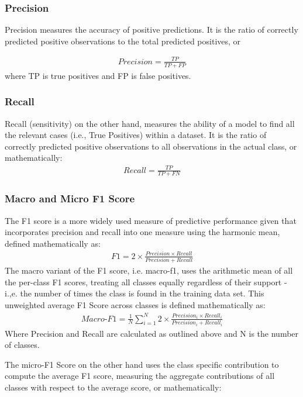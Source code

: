 \documentclass[final]{clv2025-revised}
\begin{document}
\subsubsection{Precision}
Precision measures the accuracy of positive predictions. It is the ratio of correctly predicted positive observations to the total predicted positives, or 

\begin{align*}
    Precision=\frac{TP}{TP+FP}
\end{align*}
where TP is true positives and FP is false positives. 

\subsubsection{Recall}
Recall (sensitivity) on the other hand, measures the ability of a model to find all the relevant cases (i.e., True Positives) within a dataset. It is the ratio of correctly predicted positive observations to all observations in the actual class, or mathematically:
\begin{align*}
    Recall=\frac{TP}{TP+FN}
\end{align*}

\subsubsection{Macro and Micro F1 Score}
The F1 score is a more widely used measure of predictive performance given that incorporates precision and recall into one measure using the harmonic mean, defined mathematically as: 
\begin{align*}
  F1=2\times \frac{Precision\times Recall}{Precision+Recall}  
\end{align*}
The macro variant of the F1 score, i.e. macro-f1, uses the arithmetic mean of all the per-class F1 scores, treating all classes equally regardless of their support - i.,e. the number of times the class is found in the training data set. This unweighted average F1 Score across classes is defined mathematically as:
\begin{align*}
    Macro\text{-}F1=\frac{1}{N }\sum_{i=1}^{N} 2\times \frac{Precision_i\times Recall_i}{Precision_i+Recall_i} 
\end{align*}
Where Precision and Recall are calculated as outlined above and N is the number of classes.

The micro-F1 Score on the other hand uses the class specific contribution to compute the average F1 score, measuring the aggregate contributions of all classes with respect to the average score, or mathematically:
\end{document}
